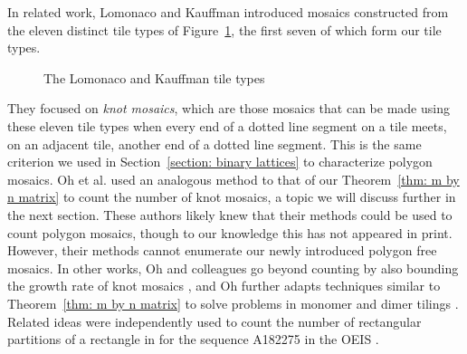 \documentclass[12pt]{article}
\theoremstyle{plain}
\theoremstyle{remark}
\theoremstyle{definition}
\theoremstyle{remark}
\theoremstyle{definition}
\newcommand{\cell}[4]{ \draw[thick] ( #1 , #2 ) rectangle ( #3 , #4 );}
\newcommand{\cellA}[4]{ \draw[thick] ( #1 , #2 ) rectangle ( #3 , #4 ); \draw[red, thick, densely dotted] (#3 * 0.5 + #1 * 0.5 , #2) -- (#1, #4 * 0.5 + #2 * 0.5);}
\newcommand{\cellB}[4]{ \draw[thick] ( #1 , #2 ) rectangle ( #3 , #4 ); \draw[red, thick, densely dotted] (#3 * 0.5 + #1 * 0.5 , #2) -- (#3, #4 * 0.5 + #2 * 0.5);}
\newcommand{\cellC}[4]{ \draw[thick] ( #1 , #2 ) rectangle ( #3 , #4 ); \draw[red, thick, densely dotted] (#3 * 0.5 + #1 * 0.5 , #4) -- (#3, #4 * 0.5 + #2 * 0.5);}
\newcommand{\cellD}[4]{ \draw[thick] ( #1 , #2 ) rectangle ( #3 , #4 ); \draw[red, thick, densely dotted] (#3 * 0.5 + #1 * 0.5 , #4) -- (#1, #4 * 0.5 + #2 * 0.5);}
\newcommand{\cellE}[4]{ \draw[thick] ( #1 , #2 ) rectangle ( #3 , #4 ); \draw[red, thick, densely dotted] (#3, #4 * 0.5 + #2 * 0.5) -- (#1, #4 * 0.5 + #2 * 0.5);}
\newcommand{\cellF}[4]{ \draw[thick] ( #1 , #2 ) rectangle ( #3 , #4 ); \draw[red, thick, densely dotted] (#3 * 0.5 + #1 * 0.5 , #2) -- (#3 * 0.5 + #1 * 0.5 , #4);}
\newcommand{\cellG}[4]{\draw[red, thick, densely dotted] (#3 * 0.5 + #1 * 0.5 , #2) -- (#1, #4 * 0.5 + #2 * 0.5); \draw[red, thick, densely dotted] (#3 * 0.5 + #1 * 0.5 , #4) -- (#3, #4 * 0.5 + #2 * 0.5); \draw[thick] ( #1 , #2 ) rectangle ( #3 , #4 );}
\newcommand{\cellH}[4]{\draw[red, thick, densely dotted] (#3 * 0.5 + #1 * 0.5 , #2) -- (#3, #4 * 0.5 + #2 * 0.5); \draw[red, thick, densely dotted] (#3 * 0.5 + #1 * 0.5 , #4) -- (#1, #4 * 0.5 + #2 * 0.5); \draw[thick] ( #1 , #2 ) rectangle ( #3 , #4 );}
\newcommand{\cellI}[4]{\draw[red, thick, densely dotted] (#3 * 0.5 + #1 * 0.5 , #2) -- (#3 * 0.5 + #1 * 0.5 , #4); \node[shape=circle,draw=none,fill=white, inner sep=3pt,minimum size=5pt] (A) at ( #1 + 0.5 , #2 + 0.5 ) {}; \draw[red, thick, densely dotted] (#3, #4 * 0.5 + #2 * 0.5) -- (#1, #4 * 0.5 + #2 * 0.5); \draw[thick] ( #1 , #2 ) rectangle ( #3 , #4 );}
\newcommand{\cellJ}[4]{\draw[red, thick, densely dotted] (#3, #4 * 0.5 + #2 * 0.5) -- (#1, #4 * 0.5 + #2 * 0.5); \node[shape=circle,draw=none,fill=white, inner sep=3pt,minimum size=5pt] (A) at ( #1 + 0.5 , #2 + 0.5 ) {}; \draw[thick] ( #1 , #2 ) rectangle ( #3 , #4 ); \draw[red, thick, densely dotted] (#3 * 0.5 + #1 * 0.5 , #2) -- (#3 * 0.5 + #1 * 0.5 , #4);}
\newcommand{\lablnode}[3]{\node[shape=circle,draw=none,fill=none, inner sep=0pt,minimum size=0pt] (A) at ( #1 , #2 ) {#3};}
\begin{document}
In related work, Lomonaco and Kauffman \cite{Lomonaco08} introduced mosaics constructed from the eleven distinct tile types of Figure~\ref{fig: lk tile set}, the first seven of which form our tile types.

\begin{figure}[h!]
\begin{center}
\end{center}
\caption{The Lomonaco and Kauffman tile types \cite{Lomonaco08}}
\label{fig: lk tile set}
\end{figure}

\noindent They focused on \textit{knot mosaics}, which are those mosaics that can be made using these eleven tile types when every end of a dotted line segment on a tile meets, on an adjacent tile, another end of a dotted line segment. This is the same criterion we used in Section~\ref{section: binary lattices} to characterize polygon mosaics. Oh et al. \cite{Oh2014} used an analogous method to that of our Theorem~\ref{thm: m by n matrix} to count the number of knot mosaics, a topic we will discuss further in the next section. These authors likely knew that their methods could be used to count polygon mosaics, though to our knowledge this has not appeared in print. However, their methods cannot enumerate our newly introduced polygon free mosaics. In other works, Oh and colleagues go beyond counting by also bounding the growth rate of knot mosaics \cite{Choi2024, Oh2016, Oh2019}, and Oh further adapts techniques similar to Theorem~\ref{thm: m by n matrix} to solve problems in monomer and dimer tilings \cite{Oh2018Aztec, Oh2019tiling}. Related ideas were independently used to count the number of rectangular partitions of a rectangle in \cite{oeispaper} for the sequence A182275 in the OEIS \cite{oeis}.
\end{document}
